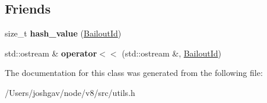 \subsection*{Friends}
\begin{DoxyCompactItemize}
\item 
size\+\_\+t {\bfseries hash\+\_\+value} (\hyperlink{classv8_1_1internal_1_1_bailout_id}{Bailout\+Id})\hypertarget{classv8_1_1internal_1_1_bailout_id_abd47c7473aac8fb7ceacb1bf92be7efa}{}\label{classv8_1_1internal_1_1_bailout_id_abd47c7473aac8fb7ceacb1bf92be7efa}

\item 
std\+::ostream \& {\bfseries operator$<$$<$} (std\+::ostream \&, \hyperlink{classv8_1_1internal_1_1_bailout_id}{Bailout\+Id})\hypertarget{classv8_1_1internal_1_1_bailout_id_a4f5e91108ed694468cb3960ace6487b8}{}\label{classv8_1_1internal_1_1_bailout_id_a4f5e91108ed694468cb3960ace6487b8}

\end{DoxyCompactItemize}


The documentation for this class was generated from the following file\+:\begin{DoxyCompactItemize}
\item 
/\+Users/joshgav/node/v8/src/utils.\+h\end{DoxyCompactItemize}
